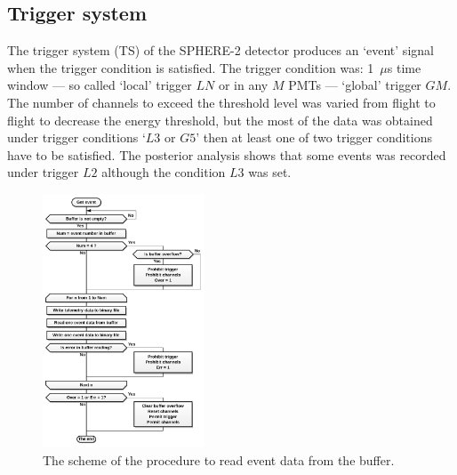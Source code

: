 \documentclass[final,5p,times,twocolumn]{elsarticle}
\begin{document}
\subsection{Trigger system}
The trigger system (TS) of the SPHERE-2 detector produces an `event' signal when the trigger condition is satisfied. The trigger condition was: 1~${\mu}$s time window --- so called `local' trigger $LN$ or in any $M$ PMTs --- `global' trigger $GM$. The number of channels to exceed the threshold level was varied from flight to flight to decrease the energy threshold, but the most of the data was obtained under trigger conditions `$L3$ or $G5$' then at least one of two trigger conditions have to be satisfied. The posterior analysis shows that some events was recorded under trigger $L2$ although the condition $L3$ was set.


\begin{figure}[t]
    \centering
    \includegraphics[width=0.43\textwidth]{figs/get_event_algorithm.pdf}\hspace{2pc}%
    \caption{The scheme of the procedure to read event data from the buffer.}
\label{fig:get_event_algorithm}
\end{figure}
\end{document}

